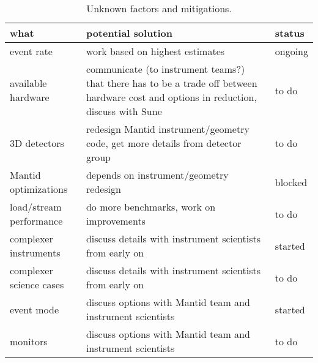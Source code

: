 \documentclass[a4paper,english,numbers=noenddot,bibliography=totoc,chapterprefix=on,DIV=12]{scrartcl}
\begin{document}
\begin{table}
    \small
\begin{tabularx}{\textwidth}{lXl}
    \hline
    what & potential solution & status \\
    \hline
    event rate & work based on highest estimates & ongoing \\
    available hardware & communicate (to instrument teams?) that there has to be a trade off between hardware cost and options in reduction, discuss with Sune & to do \\
    3D detectors & redesign Mantid instrument/geometry code, get more details from detector group & to do \\
    Mantid optimizations & depends on instrument/geometry redesign & blocked\\
    load/stream performance & do more benchmarks, work on improvements & to do \\
    complexer instruments & discuss details with instrument scientists from early on & started \\
    complexer science cases & discuss details with instrument scientists from early on & to do \\
    event mode & discuss options with Mantid team and instrument scientists & started \\
    monitors &  discuss options with Mantid team and instrument scientists & to do \\
    \hline
\end{tabularx}
\caption{\label{tab:unknown_factors}Unknown factors and mitigations.}
\end{table}
\end{document}
